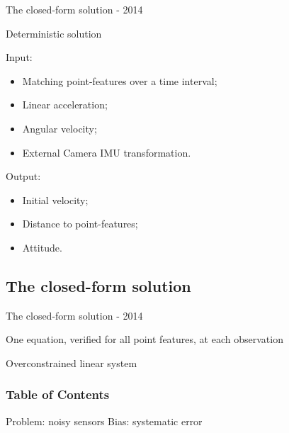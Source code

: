\documentclass{beamer}
\begin{document}



\begin{frame}{The closed-form solution - 2014}

Deterministic solution


Input:
\begin{itemize}
\item Matching point-features over a time interval; \hfill {}
\item Linear acceleration; \hfill {}
\item Angular velocity; \hfill {}
\item External Camera IMU transformation. \hfill {}
\end{itemize}

Output:
\begin{itemize}
\item Initial velocity; \hfill {}
\item Distance to point-features; \hfill {}
\item Attitude.
\end{itemize}

\end{frame}



\subsection{The closed-form solution}

\begin{frame}{The closed-form solution - 2014}

One equation, verified for all point features, at each observation


Overconstrained linear system

\end{frame}

\begin{frame}
\frametitle{Table of Contents}
\tableofcontents
\end{frame}


\begin{frame}{Problem: noisy sensors}
Bias: systematic error
\end{frame}
\end{document}
